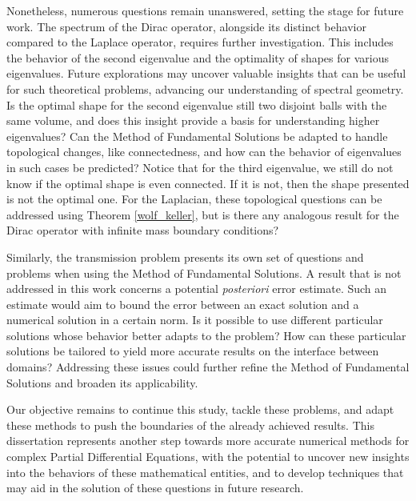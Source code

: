 Nonetheless, numerous questions remain unanswered, setting the stage for future work. The spectrum of the Dirac operator, alongside its distinct behavior compared to the Laplace operator, requires further investigation. This includes the behavior of the second eigenvalue and the optimality of shapes for various eigenvalues. Future explorations may uncover valuable insights that can be useful for such theoretical problems, advancing our understanding of spectral geometry. Is the optimal shape for the second eigenvalue still two disjoint balls with the same volume, and does this insight provide a basis for understanding higher eigenvalues? Can the Method of Fundamental Solutions be adapted to handle topological changes, like connectedness, and how can the behavior of eigenvalues in such cases be predicted? Notice that for the third eigenvalue, we still do not know if the optimal shape is even connected. If it is not, then the shape presented is not the optimal one. For the Laplacian, these topological questions can be addressed using Theorem \ref{wolf_keller}, but is there any analogous result for the Dirac operator with infinite mass boundary conditions?

Similarly, the transmission problem presents its own set of questions and problems when using the Method of Fundamental Solutions. A result that is not addressed in this work concerns a potential \textit{posteriori} error estimate. Such an estimate would aim to bound the error between an exact solution and a numerical solution in a certain norm. Is it possible to use different particular solutions whose behavior better adapts to the problem? How can these particular solutions be tailored to yield more accurate results on the interface between domains? Addressing these issues could further refine the Method of Fundamental Solutions and broaden its applicability. 

Our objective remains to continue this study, tackle these problems, and adapt these methods to push the boundaries of the already achieved results. This dissertation represents another step towards more accurate numerical methods for complex Partial Differential Equations, with the potential to uncover new insights into the behaviors of these mathematical entities, and to develop techniques that may aid in the solution of these questions in future research.